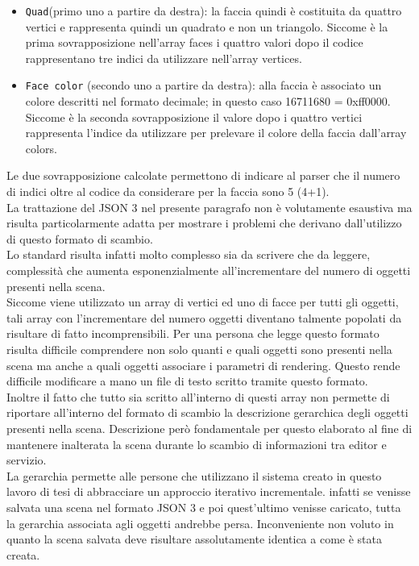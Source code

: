 \begin{itemize}
\item \texttt{Quad}(primo uno a partire da destra): la faccia quindi è costituita da quattro vertici e rappresenta quindi un quadrato e non un triangolo. Siccome è la prima sovrapposizione nell’array faces i quattro valori dopo il codice rappresentano tre indici da utilizzare nell’array vertices.
\item \texttt{Face color} (secondo uno a partire da destra): alla faccia è associato un colore descritti nel formato decimale; in questo caso 16711680 = 0xff0000. Siccome è la seconda sovrapposizione il valore dopo i quattro vertici rappresenta l’indice da utilizzare per prelevare il colore della faccia dall’array colors.
\end{itemize}
Le due sovrapposizione calcolate permettono di indicare al parser che il numero di indici oltre al codice da considerare per la faccia sono 5 (4+1). 
\\
La trattazione del JSON 3 nel presente paragrafo non è volutamente esaustiva ma risulta particolarmente adatta per mostrare i problemi che derivano dall’utilizzo di questo formato di scambio.
\\
Lo standard risulta infatti molto complesso sia da scrivere che da leggere, complessità che aumenta esponenzialmente all’incrementare del numero di oggetti presenti nella scena.
\\
Siccome viene utilizzato un array di vertici ed uno di facce per tutti gli oggetti, tali array con l’incrementare del numero oggetti diventano talmente popolati da risultare di fatto incomprensibili. Per una persona che legge questo formato risulta difficile comprendere non solo quanti e quali oggetti sono presenti nella scena ma anche a quali oggetti associare i parametri di rendering. 
Questo rende difficile modificare a mano un file di testo scritto tramite questo formato.
\\
Inoltre il fatto che tutto sia scritto all’interno di questi array non permette di riportare all’interno del formato di scambio la descrizione gerarchica degli oggetti presenti nella scena.
Descrizione però fondamentale per questo elaborato al fine di mantenere inalterata la scena durante lo scambio di informazioni tra editor e servizio. 
\\
La gerarchia permette alle persone che utilizzano il sistema creato in questo lavoro di tesi di abbracciare un approccio iterativo incrementale. infatti se venisse salvata una scena nel formato JSON 3 e poi quest’ultimo venisse caricato, tutta la gerarchia associata agli oggetti andrebbe persa. Inconveniente non voluto in quanto la scena salvata deve risultare assolutamente identica a come è stata creata.
